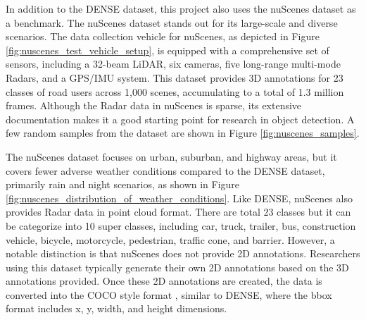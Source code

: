 \documentclass[report.tex]{subfiles}
\begin{document}
    In addition to the DENSE dataset, this project also uses the nuScenes dataset \cite{caesar2020nuscenes} as a benchmark. The nuScenes dataset stands out for its large-scale and diverse scenarios. The data collection vehicle for nuScenes, as depicted in Figure \ref{fig:nuscenes_test_vehicle_setup}, is equipped with a comprehensive set of sensors, including a 32-beam LiDAR, six cameras, five long-range multi-mode Radars, and a GPS/IMU system. This dataset provides 3D annotations for 23 classes of road users across 1,000 scenes, accumulating to a total of 1.3 million frames. Although the Radar data in nuScenes is sparse, its extensive documentation makes it a good starting point for research in object detection. A few random samples from the dataset are shown in Figure \ref{fig:nuscenes_samples}.

    The nuScenes dataset focuses on urban, suburban, and highway areas, but it covers fewer adverse weather conditions compared to the DENSE dataset, primarily rain and night scenarios, as shown in Figure \ref{fig:nuscenes_distribution_of_weather_conditions}. Like DENSE, nuScenes also provides Radar data in point cloud format. There are total 23 classes but it can be categorize into 10 super classes, including car, truck, trailer, bus, construction vehicle, bicycle, motorcycle, pedestrian, traffic cone, and barrier. However, a notable distinction is that nuScenes does not provide 2D annotations. Researchers using this dataset typically generate their own 2D annotations based on the 3D annotations provided. Once these 2D annotations are created, the data is converted into the COCO style format \cite{lin2014microsoft}, similar to DENSE, where the bbox format includes x, y, width, and height dimensions.



\end{document}
